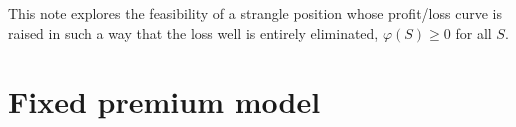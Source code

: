 \documentclass[aps,reprint]{revtex4-2}
\begin{document}

This note explores the feasibility of a strangle position whose profit/loss curve is raised in such a way that the loss well is entirely eliminated,  $\varphi(S) \geq 0$ for all $S$. 

\section{Fixed premium model}
\end{document}
